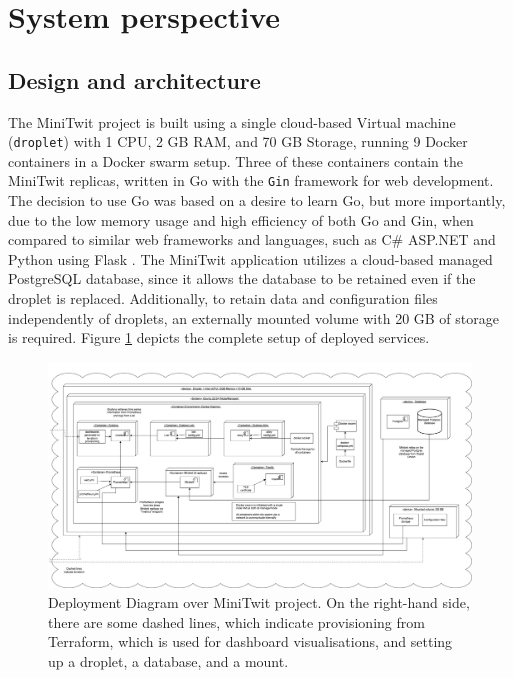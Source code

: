 \section{System perspective} \label{sp}
\subsection{Design and architecture}
The MiniTwit project is built using a single cloud-based  Virtual machine (\texttt{droplet}) with 1 CPU, 2 GB RAM, and 70 GB Storage, running 9 Docker containers in a Docker swarm setup. Three of these containers contain the MiniTwit replicas, written in Go with the \texttt{Gin} framework for web development. The decision to use Go was based on a desire to learn Go, but more importantly, due to the low memory usage and high efficiency of both Go and Gin, when compared to similar web frameworks and languages, such as C\# ASP.NET and Python using Flask \parencite{benchmark}. The MiniTwit application utilizes a cloud-based managed PostgreSQL database, since it allows the database to be retained even if the droplet is replaced. Additionally, to retain data and configuration files independently of droplets, an externally mounted volume with 20 GB of storage is required. Figure \ref{fig:Deployment} depicts the complete setup of deployed services.

\begin{landscape}
\begin{figure}[H]
    \centering
    \includegraphics[width=1\linewidth]{images/deploydiag.png}
    \caption{Deployment Diagram over MiniTwit project. On the right-hand side, there are some dashed lines, which indicate provisioning from Terraform, which is used for dashboard visualisations, and setting up a droplet, a database, and a mount.}
    \label{fig:Deployment}
\end{figure}
\end{landscape}


